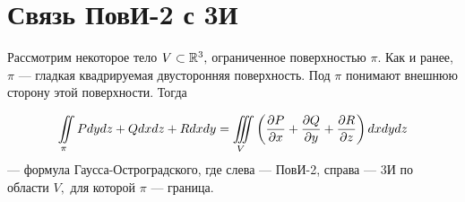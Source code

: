 \documentclass[../../main.tex]{subfiles}
\begin{document}
\section{Связь ПовИ-2 с 3И}

Рассмотрим некоторое тело $V\subset \mathbb{R}^3,$ ограниченное поверхностью $\pi.$ Как и ранее, $\pi$ --- гладкая квадрируемая двусторонняя поверхность. Под $\pi$ понимают внешнюю сторону этой поверхности. Тогда 

\begin{equation}\label{lec24, num_3}
\iint\limits_\pi Pdydz +  Qdxdz + Rdxdy = \iiint\limits_V \left(\frac{\partial P}{\partial x}  + \frac{\partial Q}{\partial y} + \frac{\partial R}{\partial z}\right) dxdydz\end{equation} --- формула Гаусса-Остроградского, где слева --- ПовИ-2, справа --- 3И по области $V,$ для которой $\pi$ --- граница.
\end{document}
